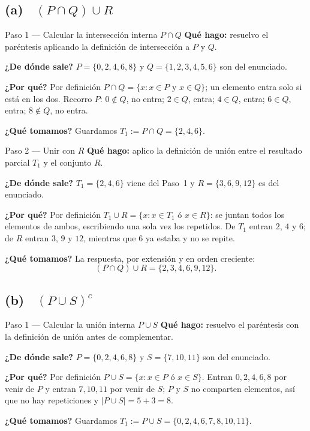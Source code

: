 \documentclass[11pt]{article}
\begin{document}
\subsection*{(a) \ $(P\cap Q)\cup R$}

\begin{paso}{Paso 1 --- Calcular la intersección interna $P\cap Q$}
\textbf{Qué hago:} resuelvo el paréntesis aplicando la definición de intersección a $P$ y $Q$.

\textbf{¿De dónde sale?} $P=\{0,2,4,6,8\}$ y $Q=\{1,2,3,4,5,6\}$ son del enunciado.

\textbf{¿Por qué?} Por definición $P\cap Q=\{x: x\in P \text{ y } x\in Q\}$; un elemento entra
solo si está en los dos. Recorro $P$: $0\notin Q$, no entra; $2\in Q$, entra; $4\in Q$, entra;
$6\in Q$, entra; $8\notin Q$, no entra.

\textbf{¿Qué tomamos?} Guardamos $T_1:=P\cap Q=\{2,4,6\}$.
\end{paso}

\begin{paso}{Paso 2 --- Unir con $R$}
\textbf{Qué hago:} aplico la definición de unión entre el resultado parcial $T_1$ y el
conjunto $R$.

\textbf{¿De dónde sale?} $T_1=\{2,4,6\}$ viene del Paso~1 y $R=\{3,6,9,12\}$ es del enunciado.

\textbf{¿Por qué?} Por definición $T_1\cup R=\{x: x\in T_1 \text{ ó } x\in R\}$: se juntan
todos los elementos de ambos, escribiendo una sola vez los repetidos. De $T_1$ entran $2$, $4$
y $6$; de $R$ entran $3$, $9$ y $12$, mientras que $6$ ya estaba y no se repite.

\textbf{¿Qué tomamos?} La respuesta, por extensión y en orden creciente:
\[
(P\cap Q)\cup R=\{2,3,4,6,9,12\}.
\]
\end{paso}

\subsection*{(b) \ $(P\cup S)^{c}$}

\begin{paso}{Paso 1 --- Calcular la unión interna $P\cup S$}
\textbf{Qué hago:} resuelvo el paréntesis con la definición de unión antes de complementar.

\textbf{¿De dónde sale?} $P=\{0,2,4,6,8\}$ y $S=\{7,10,11\}$ son del enunciado.

\textbf{¿Por qué?} Por definición $P\cup S=\{x: x\in P \text{ ó } x\in S\}$. Entran $0,2,4,6,8$
por venir de $P$ y entran $7,10,11$ por venir de $S$; $P$ y $S$ no comparten elementos, así
que no hay repeticiones y $|P\cup S|=5+3=8$.

\textbf{¿Qué tomamos?} Guardamos $T_1:=P\cup S=\{0,2,4,6,7,8,10,11\}$.
\end{paso}
\end{document}
